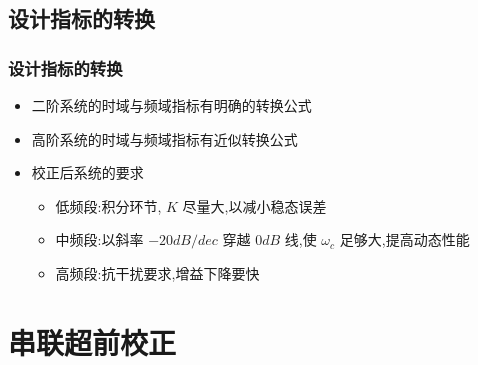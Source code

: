 \documentclass[table]{beamer}
\begin{document}
\subsection{设计指标的转换}
\label{sec-1-2}
\begin{frame}
\frametitle{设计指标的转换}
\label{sec-1-2-1}

\begin{itemize}
\item <2->二阶系统的时域与频域指标有明确的转换公式
\item <3->高阶系统的时域与频域指标有近似转换公式
\item <4->校正后系统的要求
\begin{itemize}
\item <4->低频段:积分环节, $K$ 尽量大,以减小稳态误差
\item <5->中频段:以斜率 $-20dB/dec$ 穿越 $0dB$ 线,使 $\omega_c$ 足够大,提高动态性能
\item <6->高频段:抗干扰要求,增益下降要快
\end{itemize}
\end{itemize}
\end{frame}
\section{串联超前校正}
\label{sec-2}
\end{document}
